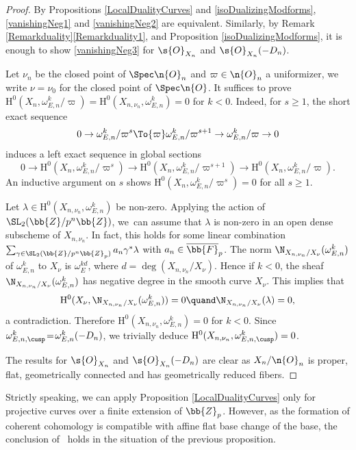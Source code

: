 \begin{proof}
By Propositions \ref{LocalDualityCurves} and \ref{isoDualizingModforms}, \eqref{vanishingNeg1} and \eqref{vanishingNeg2} are equivalent. Similarly, by \hbox{Remark} \ref{Remarkduality}\eqref{Remarkduality1}, and Proposition \ref{isoDualizingModforms}, it is enough to show \eqref{vanishingNeg3} for $\s{O}_{X_n}$ and $\s{O}_{X_n}(-D_n)$.

Let $\nu_n$ be the closed point of $\Spec \n{O}_n$ and $\varpi\in \n{O}_n$ a uniformizer, we write $\nu=\nu_0$ for the closed point of $\Spec \n{O}$. It suffices to prove $\mathrm{H}^0(X_{n}, \omega^k_{E,n}/\varpi)=\mathrm{H}^0(X_{n,\nu_n}, \omega^k_{E,n})=0$ for $k<0$. Indeed, for $s\geq 1$, the short exact sequence
\[0\to \omega^k_{E,n}/ \varpi^{s}\To{\varpi} \omega^k_{E,n}/\varpi^{s+1}\to \omega^{k}_{E,n}/\varpi \to 0\]
induces a left exact sequence in global sections
\[
0\to \mathrm{H}^0(X_n, \omega^k_{E,n}/ \varpi^s)\to \mathrm{H}^0(X_n, \omega^k_{E,n}/\varpi^{s+1})\to \mathrm{H}^0(X_n, \omega^k_{E,n}/\varpi).
\]
An inductive argument on $s$ shows $\mathrm{H}^0(X_n, \omega^k_{E,n}/\varpi^s)=0$ for all $s\geq 1$.

Let $\lambda\in \mathrm{H}^0(X_{n,\nu_n}, \omega^k_{E,n})$ be non-zero. Applying the action of $\SL_2(\bb{Z}/p^n\bb{Z})$, we~can assume that $\lambda$ is non-zero in an open dense subscheme of $X_{n,\nu_n}$. In fact, this holds for some linear combination $\sum_{\gamma\in \SL_2(\bb{Z}/p^n\bb{Z}_p)} a_n \gamma^* \lambda$ with $a_n\in \overline{\bb{F}}_p$. The norm $\N_{X_{n,\nu_n}/X_{\nu}}(\omega^k_{E,n})$ of $\omega^k_{E,n}$ to $X_\nu$ is $\omega^{kd}_{E}$, where $d=\deg(X_{n,\nu_n}/X_\nu)$. Hence if $k<0$, the sheaf $\N_{X_{n,\nu_n}/X_\nu}(\omega^k_{E,n})$ has negative degree in the smooth curve $X_{\nu}$. This implies that
\[
\mathrm{H}^0(X_{\nu}, \N_{X_{n,\nu_n}/X_\nu}(\omega^k_{E,n}))=0\quand\N_{X_{n,\nu_n}/X_{\nu}}(\lambda)=0,
\]
a contradiction. Therefore $\mathrm{H}^0(X_{n,\nu_n}, \omega^k_{E,n})\!=\!0$ for $k\!<\!0$. Since $\omega^k_{E,n,\cusp}\!=\!\omega_{E,n}^k(-D_n)$, we trivially deduce $\mathrm{H}^0(X_{n,\nu_n},\omega^k_{E,n,\cusp})=0$.

The results for $\s{O}_{X_n}$ and $\s{O}_{X_n}(-D_n)$ are clear as $X_n/\n{O}_{n}$ is proper, flat, geometrically connected and has geometrically reduced fibers.
\end{proof}

\begin{remark}
\label{remark1}
Strictly speaking, we can apply Proposition \ref{LocalDualityCurves} only for projective curves over a finite extension of $\bb{Z}_p$. However, as the formation of coherent cohomology is compatible with affine flat base change of the base, the conclusion of \loccit\ holds in the situation of the previous proposition.
\end{remark}

